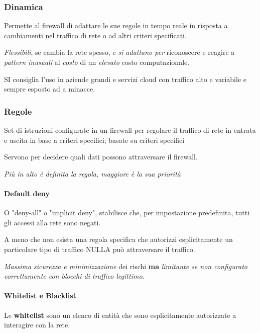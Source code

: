 \subsubsection{Dinamica}\label{dinamica}

Permette al firewall di adattare le sue regole in tempo reale in
risposta a cambiamenti nel traffico di rete o ad altri criteri
specificati.

\emph{Flessibili}, se cambia la rete spesso, e \emph{si adattano per}
riconoscere e reagire a \emph{pattern inusuali} al \emph{costo} di un
\emph{elevato} costo computazionale.

SI consiglia l'uso in aziende grandi e servizi cloud con traffico alto e
variabile e sempre esposto ad a minacce.

\subsubsection{Regole}\label{regole}

Set di istruzioni configurate in un firewall per regolare il traffico di
rete in entrata e uscita in base a criteri specifici; basate su criteri
specifici

Servono per decidere quali dati possono attraversare il firewall.

\emph{Più in alto è definita la regola, maggiore è la sua priorità}

\paragraph{Default deny}\label{default-deny}

O "deny-all" o "implicit deny", stabilisce che, per impostazione
predefinita, tutti gli accessi alla rete sono negati.

A meno che non esista una regola specifica che autorizzi esplicitamente
un particolare tipo di traffico NULLA può attraversare il traffico.

\emph{Massima sicurezza e minimizzazione} dei rischi \textbf{ma}
\emph{limitante se non configurato correttamente con blocchi di traffico
legittimo}.

\paragraph{Whitelist e Blacklist}\label{whitelist-e-blacklist}

Le \textbf{whitelist} sono un elenco di entità che sono esplicitamente
autorizzate a interagire con la rete.

